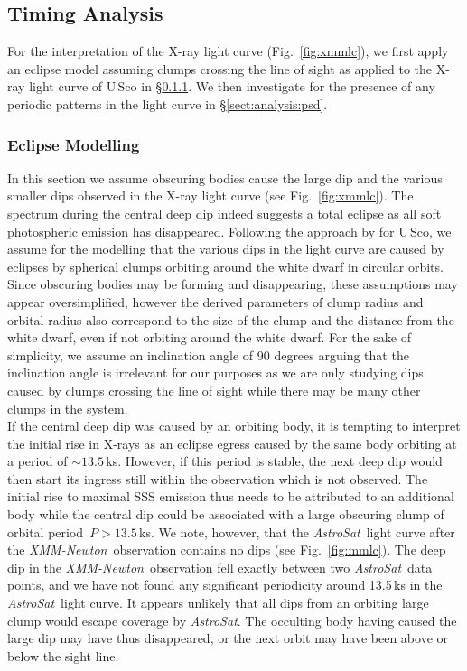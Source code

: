 \documentclass{aa}
\newcommand{\xmm}{{\it XMM-Newton}}
\newcommand{\asat}{{\it AstroSat}}
\begin{document}
\subsection{Timing Analysis}
\label{sect:analysis:timing}

For the interpretation of the X-ray light curve (Fig.~\ref{fig:xmmlc}),
we first apply an eclipse model assuming clumps crossing the line of sight
as applied to the X-ray light curve of U\,Sco \citep{nessusco} in
\S\ref{sect:analysis:ecl}. We then investigate for the presence of any
periodic patterns in the light curve in \S\ref{sect:analysis:psd}.

\subsubsection{Eclipse Modelling}
\label{sect:analysis:ecl}

In this section we assume obscuring bodies cause the large dip and
the various smaller dips observed in the X-ray light curve (see
Fig.~\ref{fig:xmmlc}).
The spectrum during the central deep dip indeed suggests a total eclipse
as all soft photospheric emission has disappeared.
Following the approach by \cite{nessusco} for U\,Sco, we assume
for the modelling that the various dips in the light curve are caused
by eclipses by spherical clumps orbiting around the white dwarf in
circular orbits. Since obscuring bodies may be forming and disappearing,
these assumptions may appear oversimplified, however the derived parameters
of clump radius and orbital radius also correspond to the size of the
clump and the distance from the white dwarf, even if not orbiting
around the white dwarf. For the sake of simplicity, we assume an
inclination angle of 90 degrees arguing that the inclination
angle is irrelevant for our purposes as we are only studying
dips caused by clumps crossing the line of sight while there may be
many other clumps in the system.\\

If the central deep dip was caused by an orbiting body, it is tempting
to interpret the initial rise in X-rays as an eclipse egress caused by
the same body orbiting at a period of $\sim 13.5$\,ks. However, if this
period is stable, the next deep dip would then start its ingress still
within the observation which
is not observed. The initial rise to maximal SSS emission thus needs to be
attributed to an additional body while the central dip could be associated
with a large obscuring clump of orbital period~$P > 13.5$\,ks. We note,
however, that the \asat\ light curve after the \xmm\ observation
contains no dips (see Fig.~\ref{fig:mmlc}). The deep dip in the
\xmm\ observation fell exactly between two \asat\ data points, and we have
not found any significant periodicity around 13.5\,ks in the \asat\
light curve. It appears
unlikely that all dips from an orbiting large clump would escape coverage
by \asat. The occulting body having caused the large dip may have thus
disappeared, or the next orbit may have been above or below the sight line.\\
\end{document}
